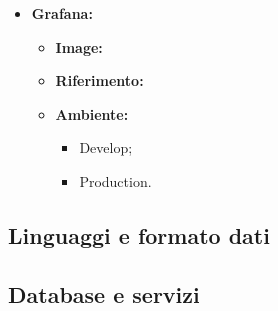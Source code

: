 \begin{itemize}
  \item \textbf{Grafana:} 
    \begin{itemize}
      \item \textbf{Image:}
      \item \textbf{Riferimento:}
      \item \textbf{Ambiente:}
        \begin{itemize}
          \item Develop;
          \item Production.
        \end{itemize}
    \end{itemize}
\end{itemize}

\subsection{Linguaggi e formato dati}






\subsection{Database e servizi}







